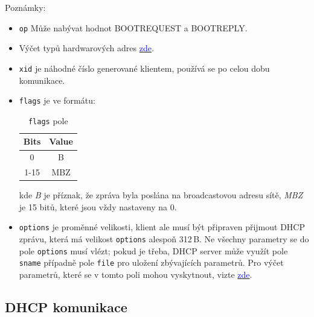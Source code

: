 \documentclass[a4paper, 11pt, hidelinks]{article}
\begin{document}

Poznámky:
\begin{itemize}
    \item \texttt{op} Může nabývat hodnot BOOTREQUEST a BOOTREPLY.
    \item Výčet typů hardwarových adres \href{https://www.iana.org/assignments/arp-parameters/arp-parameters.xhtml#arp-parameters-2}{\textcolor{blue}{zde}}.
    \item \texttt{xid} je náhodné číslo generované klientem, používá se po celou dobu komunikace.
    \item \texttt{flags} je ve formátu: 

        \begin{table}[ht]
            \centering
            \begin{tabular}{|c|c|}
            \hline
            \textbf{Bits} & \textbf{Value} \\
            \hline
            0             & B \\
            1-15          & MBZ \\
            \hline
            \end{tabular}
            \caption{\texttt{flags} pole}
            \label{tab:dhcp_flags}
        \end{table}
        
        kde \emph{B} je příznak, že zpráva byla poslána na broadcastovou adresu sítě, \emph{MBZ} je 15 bitů, které jsou vždy nastaveny na 0.
    \item \texttt{options} je proměnné velikosti, klient ale musí být připraven přijmout DHCP zprávu, která má velikost \texttt{options} alespoň 312\,B.
    Ne všechny parametry se do pole \texttt{options} musí vlézt; pokud je třeba, DHCP server může využít pole \texttt{sname} případně pole \texttt{file} pro uložení zbývajících parametrů.
    Pro výčet parametrů, které se v tomto poli mohou vyskytnout, vizte \href{https://www.iana.org/assignments/bootp-dhcp-parameters/bootp-dhcp-parameters.xhtml#options}{\textcolor{blue}{zde}}.
\end{itemize}

\subsection{DHCP komunikace}\label{1_2_komunikace}
\end{document}
